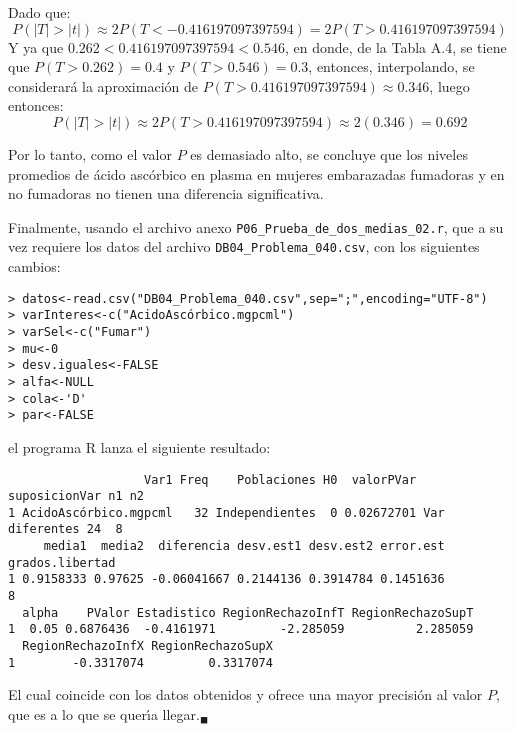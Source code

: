 \begin{solucion}
 \begin{valorp}
  Dado que:
  \begin{equation*}
   P\left( |T| > |t| \right) \approx 2P(T < -0.416197097397594)
   = 2P(T > 0.416197097397594)
  \end{equation*}
  Y ya que $0.262 < 0.416197097397594 < 0.546$,
  en donde, de la Tabla A.4, se tiene que $P(T > 0.262) = 0.4$
  y $P(T > 0.546) = 0.3$,
  entonces, interpolando, se considerar\'a la aproximaci\'on
  de $P(T > 0.416197097397594) \approx 0.346$, luego entonces:
  \begin{equation*}
   P\left( |T| > |t| \right) \approx 2P(T > 0.416197097397594)
   \approx 2(0.346) = 0.692 
  \end{equation*}
 \end{valorp}

 \begin{conclusion}
  Por lo tanto, como el valor $P$ es demasiado alto, se concluye
  que los niveles promedios de \'acido asc\'orbico en plasma
  en mujeres embarazadas fumadoras y en no fumadoras
  no tienen una diferencia significativa.
 \end{conclusion}

 Finalmente, usando el archivo anexo
 \texttt{P06\_Prueba\_de\_dos\_medias\_02.r},
 que a su vez requiere los datos del archivo
 \texttt{DB04\_Problema\_040.csv},
 con los siguientes cambios:
 \begin{verbatim}
> datos<-read.csv("DB04_Problema_040.csv",sep=";",encoding="UTF-8")
> varInteres<-c("AcidoAscórbico.mgpcml")
> varSel<-c("Fumar")
> mu<-0
> desv.iguales<-FALSE
> alfa<-NULL
> cola<-'D'
> par<-FALSE
 \end{verbatim}
 \vspace{-0.5cm}
 el programa R lanza el siguiente resultado:
 \begin{verbatim}
                   Var1 Freq    Poblaciones H0  valorPVar  suposicionVar n1 n2
1 AcidoAscórbico.mgpcml   32 Independientes  0 0.02672701 Var diferentes 24  8
     media1  media2  diferencia desv.est1 desv.est2 error.est grados.libertad
1 0.9158333 0.97625 -0.06041667 0.2144136 0.3914784 0.1451636               8
  alpha    PValor Estadistico RegionRechazoInfT RegionRechazoSupT
1  0.05 0.6876436  -0.4161971         -2.285059          2.285059
  RegionRechazoInfX RegionRechazoSupX
1        -0.3317074         0.3317074
 \end{verbatim}
 \vspace{-0.5cm}
 El cual coincide con los datos obtenidos
 y ofrece una mayor precisi\'on al valor $P$,
 que es a lo que se quer\'{\i}a llegar.${}_{\blacksquare}$
\end{solucion}
